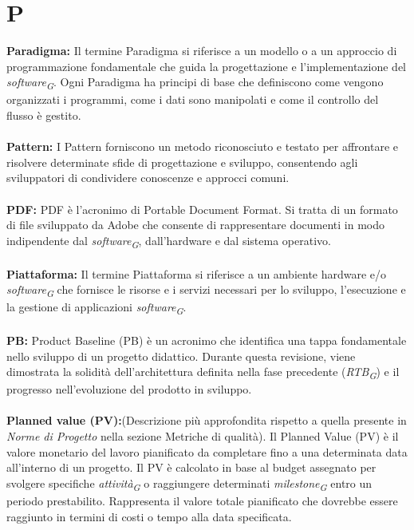 \documentclass{article}
\begin{document}
\section*{P}
{}
\textbf{Paradigma:} Il termine Paradigma si riferisce a un modello o a un approccio di programmazione fondamentale che guida la progettazione e l'implementazione del \textit{software}\textsubscript{\textit{G}}. Ogni Paradigma ha principi di base che definiscono come vengono organizzati i programmi, come i dati sono manipolati e come il controllo del flusso è gestito.
\\
\\
\textbf{Pattern:} I Pattern forniscono un metodo riconosciuto e testato per affrontare e risolvere determinate sfide di progettazione e sviluppo, consentendo agli sviluppatori di condividere conoscenze e approcci comuni.
\\
\\
\textbf{PDF:} PDF è l'acronimo di Portable Document Format. Si tratta di un formato di file sviluppato da Adobe che consente di rappresentare documenti in modo indipendente dal \textit{software}\textsubscript{\textit{G}}, dall'hardware e dal sistema operativo.
\\
\\
\textbf{Piattaforma:} Il termine Piattaforma si riferisce a un ambiente hardware e/o \textit{software}\textsubscript{\textit{G}} che fornisce le risorse e i servizi necessari per lo sviluppo, l'esecuzione e la gestione di applicazioni \textit{software}\textsubscript{\textit{G}}.
\\
\\
\textbf{PB:} Product Baseline (PB) è un acronimo che identifica una tappa fondamentale nello sviluppo di un progetto didattico. Durante questa revisione, viene dimostrata la solidità dell'architettura definita nella fase precedente (\textit{RTB}\textsubscript{\textit{G}}) e il progresso nell'evoluzione del prodotto in sviluppo.
\\
\\
\textbf{Planned value (PV):}(Descrizione più approfondita rispetto a quella presente in \textit{Norme di Progetto} nella sezione Metriche di qualità). 
Il Planned Value (PV) è il valore monetario del lavoro pianificato da completare fino a una determinata data all'interno di un progetto. Il PV è calcolato in base al budget assegnato per svolgere specifiche \textit{attività}\textsubscript{\textit{G}} o raggiungere determinati \textit{milestone}\textsubscript{\textit{G}} entro un periodo prestabilito. Rappresenta il valore totale pianificato che dovrebbe essere raggiunto in termini di costi o tempo alla data specificata.
\end{document}
